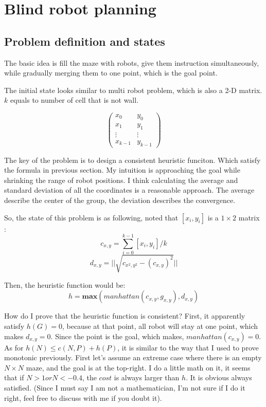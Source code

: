 \documentclass{article}
\begin{document}
\clearpage
\section{Blind robot planning}
\subsection{Problem definition and states}

The basic idea is fill the maze with robots, give them instruction simultaneously, while gradually merging them to one point, which is the goal point.

The initial state looks similar to multi robot problem, which is also a 2-D matrix. $k$ equals to number of cell that is not wall.

$$\begin{pmatrix}
x_0 & y_0 \\
x_1 & y_1 \\
\vdots & \vdots \\	
x_{k-1} & y_{k-1}
\end{pmatrix}$$

The key of the problem is to design a consistent heuristic funciton. Which satisfy the formula in previous section. My intuition is approaching the goal while shrinking the range of robot positions. I think calculating the average and standard deviation of all the coordinates is a reasonable approach. The average describe the center of the group, the deviation describes the convergence. 

So, the state of this problem is as following, noted that $[x_i,y_i]$ is a $1\times 2$ matrix :
$$c_{x,y} = \sum^{k-1}_{i=0}[x_i,y_i]/k$$
$$d_{x,y} = ||\sqrt{ c_{x^2,y^2} - (c_{x,y})^2}||$$

Then, the heuristic function would be:
$$h =\textbf{max}(manhattan(c_{x,y}, g_{x,y}), d_{x,y})$$

How do I prove that the heuristic function is consistent? First, it apparently satisfy $h(G)=0$, because at that point, all robot will stay at one point, which makes $ d_{x,y} = 0$. Since the point is the goal, which makes, $manhattan(c_{x,y})=0$. As for $h(N) \leq c(N,P)+h(P) $, it is similar to the way that I used to prove monotonic previously. First let's assume an extreme case where there is an empty $N \times N$ maze, and the goal is at the top-right. I do a little math on it, it seems that if $N > 1 or N < -0.4$, the $cost$ is always larger than $h$. It is obvious always satisfied. (Since I must say I am not a mathematician, I'm not sure if I do it right, feel free to discuss with me if you doubt it).
\end{document}
